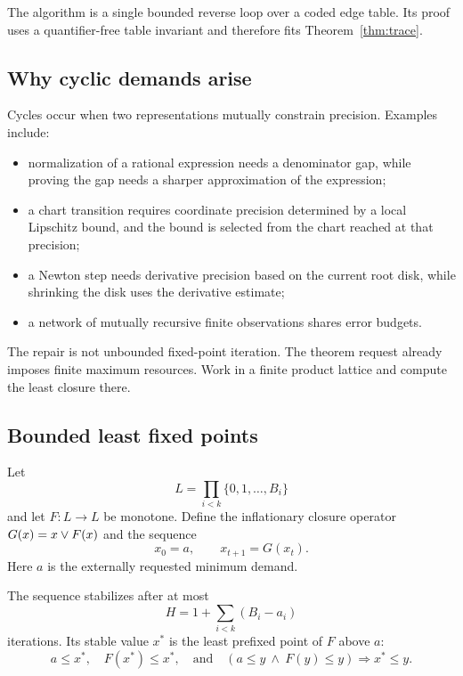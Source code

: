 The algorithm is a single bounded reverse loop over a coded edge table.  Its
proof uses a quantifier-free table invariant and therefore fits
Theorem~\ref{thm:trace}.

\subsection{Why cyclic demands arise}

Cycles occur when two representations mutually constrain precision.  Examples
include:

\begin{itemize}
\item normalization of a rational expression needs a denominator gap, while
proving the gap needs a sharper approximation of the expression;
\item a chart transition requires coordinate precision determined by a local
Lipschitz bound, and the bound is selected from the chart reached at that
precision;
\item a Newton step needs derivative precision based on the current root disk,
while shrinking the disk uses the derivative estimate;
\item a network of mutually recursive finite observations shares error budgets.
\end{itemize}

The repair is not unbounded fixed-point iteration.  The theorem request already
imposes finite maximum resources.  Work in a finite product lattice and compute
the least closure there.

\subsection{Bounded least fixed points}

Let
\[
     L=\prod_{i<k}\{0,1,\ldots,B_i\}
\]
and let \(F:L\to L\) be monotone.  Define the inflationary closure operator
\(G(x)=x\mathbin{\vee} F(x)\) and the sequence
\[
       x_0=a,\qquad x_{t+1}=G(x_t).
\]
Here \(a\) is the externally requested minimum demand.

\begin{theorem}\label{thm:finite-closure}
The sequence stabilizes after at most
\[
      H=1+\sum_{i<k}(B_i-a_i)
\]
iterations.  Its stable value \(x^*\) is the least prefixed point of \(F\) above
\(a\):
\[
  a\le x^*,\quad F(x^*)\le x^*,
  \quad\text{and}\quad
  (a\le y\ \wedge\ F(y)\le y)\Rightarrow x^*\le y.
\]
\end{theorem}

